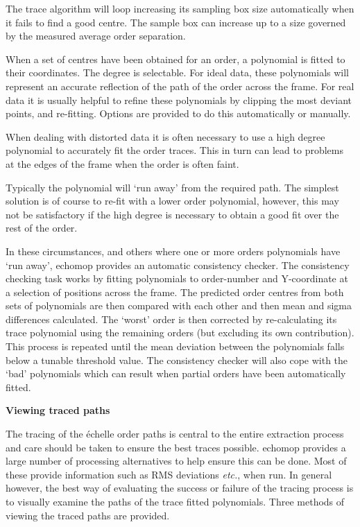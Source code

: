 \documentclass[twoside,11pt]{article}
\renewcommand{\_}{\texttt{\symbol{95}}}
\newcommand{\myindex}[1]{\index{#1}}
\newcommand{\myindex}[1]{}
\begin{document}
The trace algorithm will loop increasing its sampling box size
automatically when it fails to find a good centre. The sample box can
increase up to a size governed by the measured average order separation.

When a set of centres have been obtained for an order, a polynomial is
fitted to their coordinates. The degree is selectable.
For ideal data, these polynomials will represent an accurate reflection
of the path of the order across the frame. For real data it is usually
helpful to refine these polynomials by clipping the most deviant points,
and re-fitting.  Options are provided to do this automatically or
manually.

When dealing with distorted data it is often necessary to use a high
degree polynomial to accurately fit the order traces. This in turn can
lead to problems at the edges of the frame when the order is often
faint.

Typically the polynomial will `run away' from the required path. The
simplest solution is of course to re-fit with a lower order polynomial,
however, this may not be satisfactory if the high degree is necessary to
obtain a good fit over the rest of the order.

In these circumstances, and others where one or more orders polynomials
have `run away', {\sc echomop} provides an automatic consistency checker. The
consistency checking task works by fitting polynomials to order-number and
Y-coordinate at a selection of positions across the frame.
\myindex{Trace!consistency} The predicted order centres from both sets of
polynomials are then compared with each other and then mean and sigma
differences calculated. The `worst' order is then corrected by
re-calculating its trace polynomial using the remaining orders (but
excluding its own contribution). This process is repeated until the mean
deviation between the polynomials falls below a tunable threshold
value. The consistency checker will also cope with the `bad' polynomials
which can result when partial orders have been automatically fitted.

\newpage
{\large\bf Viewing traced paths}

The tracing of the \'{e}chelle order paths is central to the entire
extraction process and care should be taken to ensure the best traces
possible. {\sc echomop} provides a large number of processing alternatives to
help ensure this can be done. Most of these provide information such as
RMS deviations {\it etc.}, when run. In general however, the best way of
evaluating the success or failure of the tracing process is to visually
examine the paths of the trace fitted polynomials. Three methods of
viewing the traced paths are provided. \myindex{Order!viewing traces}
\end{document}
